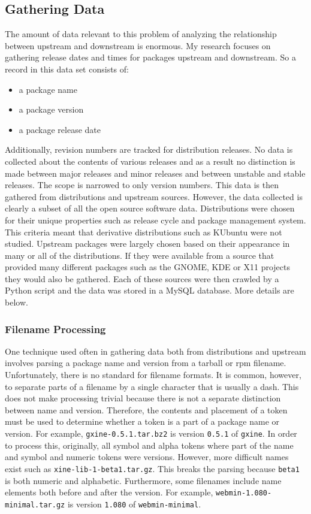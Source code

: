 \documentclass[letterpaper,10pt]{article}
\begin{document}
\subsection{Gathering Data}
The amount of data relevant to this problem of analyzing the relationship between upstream and downstream is enormous.  My research focuses on gathering release dates and times for packages upstream and downstream.  So a record in this data set consists of:
\begin{itemize}
 \item a package name
 \item a package version
 \item a package release date
\end{itemize}
Additionally, revision numbers are tracked for distribution releases.  No data is collected about the contents of various releases and as a result no distinction is made between major releases and minor releases and between unstable and stable releases.  The scope is narrowed to only version numbers.  This data is then gathered from distributions and upstream sources.  However, the data collected is clearly a subset of all the open source software data.  Distributions were chosen for their unique properties such as release cycle and package management system.  This criteria meant that derivative distributions such as KUbuntu were not studied.  Upstream packages were largely chosen based on their appearance in many or all of the distributions.  If they were available from a source that provided many different packages such as the GNOME, KDE or X11 projects they would also be gathered.  Each of these sources were then crawled by a Python script and the data was stored in a MySQL database.  More details are below.
\subsubsection{Filename Processing}
One technique used often in gathering data both from distributions and upstream involves parsing a package name and version from a tarball or rpm filename.  Unfortunately, there is no standard for filename formats.  It is common, however, to separate parts of a filename by a single character that is usually a dash.  This does not make processing trivial because there is not a separate distinction between name and version.  Therefore, the contents and placement of a token must be used to determine whether a token is a part of a package name or version.  For example, \texttt{gxine-0.5.1.tar.bz2} is version \texttt{0.5.1} of \texttt{gxine}.  In order to process this, originally, all symbol and alpha tokens where part of the name and symbol and numeric tokens were versions.  However, more difficult names exist such as \texttt{xine-lib-1-beta1.tar.gz}.  This breaks the parsing because \texttt{beta1} is both numeric and alphabetic.  Furthermore, some filenames include name elements both before and after the version. For example, \texttt{webmin-1.080-minimal.tar.gz} is version \texttt{1.080} of \texttt{webmin-minimal}.
\end{document}
